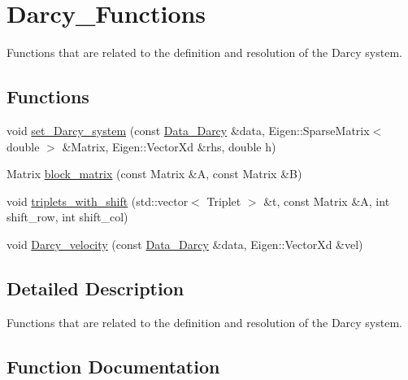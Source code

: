 \hypertarget{group__Darcy__Functions}{}\section{Darcy\+\_\+\+Functions}
\label{group__Darcy__Functions}


Functions that are related to the definition and resolution of the Darcy system.  


\subsection*{Functions}
\begin{DoxyCompactItemize}
\item 
void \hyperlink{group__Darcy__Functions_gafbabf263d46e20e1944c836bbbf5c770}{set\+\_\+\+Darcy\+\_\+system} (const \hyperlink{classData__Darcy}{Data\+\_\+\+Darcy} \&data, Eigen\+::\+Sparse\+Matrix$<$ double $>$ \&Matrix, Eigen\+::\+Vector\+Xd \&rhs, double h)
\item 
Matrix \hyperlink{group__Darcy__Functions_gae0c2d848e71b808e093e4f4f3926062a}{block\+\_\+matrix} (const Matrix \&A, const Matrix \&B)
\item 
void \hyperlink{group__Darcy__Functions_gafc7f845f0586c4a17350967bd9058834}{triplets\+\_\+with\+\_\+shift} (std\+::vector$<$ Triplet $>$ \&t, const Matrix \&A, int shift\+\_\+row, int shift\+\_\+col)
\item 
void \hyperlink{group__Darcy__Functions_gade1d46d5d0ad46fbe3419c023a693335}{Darcy\+\_\+velocity} (const \hyperlink{classData__Darcy}{Data\+\_\+\+Darcy} \&data, Eigen\+::\+Vector\+Xd \&vel)
\end{DoxyCompactItemize}


\subsection{Detailed Description}
Functions that are related to the definition and resolution of the Darcy system. 



\subsection{Function Documentation}
\mbox{\label{group__Darcy__Functions_gae0c2d848e71b808e093e4f4f3926062a}} 

